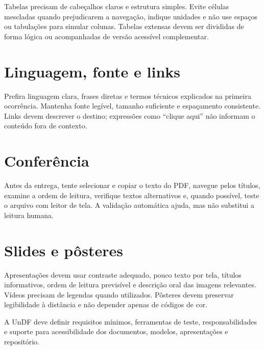 Tabelas precisam de cabeçalhos claros e estrutura simples. Evite células mescladas quando prejudicarem a navegação, indique unidades e não use espaços ou tabulações para simular colunas. Tabelas extensas devem ser divididas de forma lógica ou acompanhadas de versão acessível complementar.

\section{Linguagem, fonte e links}

Prefira linguagem clara, frases diretas e termos técnicos explicados na primeira ocorrência. Mantenha fonte legível, tamanho suficiente e espaçamento consistente. Links devem descrever o destino; expressões como ``clique aqui'' não informam o conteúdo fora de contexto.

\section{Conferência}

Antes da entrega, tente selecionar e copiar o texto do PDF, navegue pelos títulos, examine a ordem de leitura, verifique textos alternativos e, quando possível, teste o arquivo com leitor de tela. A validação automática ajuda, mas não substitui a leitura humana.

\section{Slides e pôsteres}

Apresentações devem usar contraste adequado, pouco texto por tela, títulos informativos, ordem de leitura previsível e descrição oral das imagens relevantes. Vídeos precisam de legendas quando utilizados. Pôsteres devem preservar legibilidade à distância e não depender apenas de códigos de cor.

\fluxopendente

A UnDF deve definir requisitos mínimos, ferramentas de teste, responsabilidades e suporte para acessibilidade dos documentos, modelos, apresentações e repositório.
